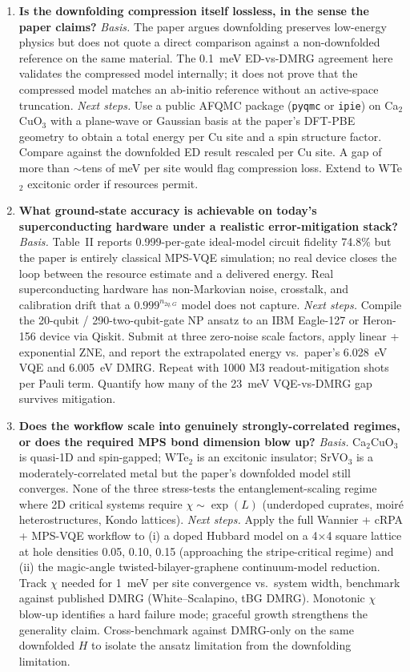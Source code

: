 \begin{enumerate}
\item \textbf{Is the downfolding compression itself lossless, in the sense the paper claims?}
\emph{Basis.} The paper argues downfolding preserves low-energy physics but does not quote a direct comparison against a non-downfolded reference on the same material. The 0.1~meV ED-vs-DMRG agreement here validates the compressed model internally; it does not prove that the compressed model matches an ab-initio reference without an active-space truncation.
\emph{Next steps.} Use a public AFQMC package (\texttt{pyqmc} or \texttt{ipie}) on Ca$_2$CuO$_3$ with a plane-wave or Gaussian basis at the paper's DFT-PBE geometry to obtain a total energy per Cu site and a spin structure factor. Compare against the downfolded ED result rescaled per Cu site. A gap of more than $\sim$tens of meV per site would flag compression loss. Extend to WTe$_2$ excitonic order if resources permit.

\item \textbf{What ground-state accuracy is achievable on today's superconducting hardware under a realistic error-mitigation stack?}
\emph{Basis.} Table~II reports 0.999-per-gate ideal-model circuit fidelity 74.8\% but the paper is entirely classical MPS-VQE simulation; no real device closes the loop between the resource estimate and a delivered energy. Real superconducting hardware has non-Markovian noise, crosstalk, and calibration drift that a $0.999^{n_{2q,G}}$ model does not capture.
\emph{Next steps.} Compile the 20-qubit / 290-two-qubit-gate NP ansatz to an IBM Eagle-127 or Heron-156 device via Qiskit. Submit at three zero-noise scale factors, apply linear + exponential ZNE, and report the extrapolated energy vs.\ paper's 6.028~eV VQE and 6.005~eV DMRG. Repeat with 1000 M3 readout-mitigation shots per Pauli term. Quantify how many of the 23~meV VQE-vs-DMRG gap survives mitigation.

\item \textbf{Does the workflow scale into genuinely strongly-correlated regimes, or does the required MPS bond dimension blow up?}
\emph{Basis.} Ca$_2$CuO$_3$ is quasi-1D and spin-gapped; WTe$_2$ is an excitonic insulator; SrVO$_3$ is a moderately-correlated metal but the paper's downfolded model still converges. None of the three stress-tests the entanglement-scaling regime where 2D critical systems require $\chi \sim \exp(L)$ (underdoped cuprates, moir\'e heterostructures, Kondo lattices).
\emph{Next steps.} Apply the full Wannier + cRPA + MPS-VQE workflow to (i) a doped Hubbard model on a 4$\times$4 square lattice at hole densities 0.05, 0.10, 0.15 (approaching the stripe-critical regime) and (ii) the magic-angle twisted-bilayer-graphene continuum-model reduction. Track $\chi$ needed for 1~meV per site convergence vs.\ system width, benchmark against published DMRG (White--Scalapino, tBG DMRG). Monotonic $\chi$ blow-up identifies a hard failure mode; graceful growth strengthens the generality claim. Cross-benchmark against DMRG-only on the same downfolded $H$ to isolate the ansatz limitation from the downfolding limitation.

\end{enumerate}
